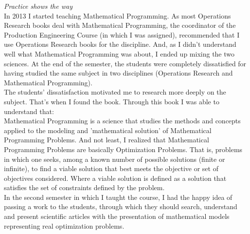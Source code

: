 \documentclass{book}
\begin{document}
\emph{Practice shows the way} \\

In 2013 I started teaching Mathematical Programming. As most Operations Research books deal with Mathematical Programming, the coordinator of the Production Engineering Course (in which I was assigned), recommended that I use Operations Research books for the discipline. And, as I didn't understand well what Mathematical Programming was about, I ended up mixing the two sciences. At the end of the semester, the students were completely dissatisfied for having studied the same subject in two disciplines (Operations Research and Mathematical Programming). \\

The students' dissatisfaction motivated me to research more deeply on the subject. That's when I found the book. Through this book I was able to understand that: \\

Mathematical Programming is a science that studies the methods and concepts applied to the modeling and 'mathematical solution' of Mathematical Programming Problems. And not least, I realized that Mathematical Programming Problems are basically Optimization Problems. That is, problems in which one seeks, among a known number of possible solutions (finite or infinite), to find a viable solution that best meets the objective or set of objectives considered. Where a viable solution is defined as a solution that satisfies the set of constraints defined by the problem. \\

In the second semester in which I taught the course, I had the happy idea of passing a work to the students, through which they should search, understand and present scientific articles with the presentation of mathematical models representing real optimization problems. \\
\end{document}
